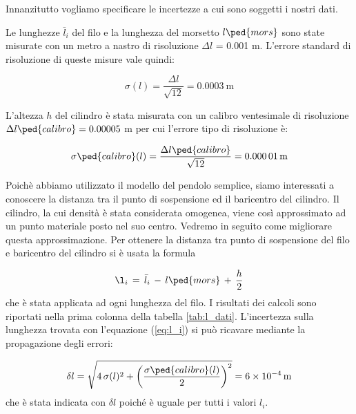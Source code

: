 \label{l_medie}

Innanzitutto vogliamo specificare le incertezze a cui sono soggetti i nostri dati.

Le lunghezze $\bar{l}_i$ del filo e la lunghezza del morsetto $l\ped{mors}$ sono state misurate con un metro a nastro di risoluzione
$\Delta l$ = 0.001 m. L'errore standard di risoluzione di queste misure vale quindi:

\begin{equation}
    \sigma(l) = \frac{\Delta l}{\sqrt{12}} = \SI{0.0003}{\metre}
\end{equation}

L'altezza $h$ del cilindro è stata misurata con un calibro ventesimale di risoluzione $\Delta l\ped{calibro} = 0.00005$ m
per cui l'errore tipo di risoluzione è:

\begin{equation}
    \sigma\ped{calibro}(l) = \frac{\Delta l\ped{calibro}}{\sqrt{12}} = \SI{0.00001}{\metre}
\end{equation}

Poichè abbiamo utilizzato il modello del pendolo semplice, siamo interessati a conoscere la distanza tra il punto
di sospensione ed il baricentro del cilindro. Il cilindro, la cui densità è stata considerata omogenea,
viene così approssimato ad un punto materiale posto nel suo centro. Vedremo in seguito come migliorare questa approssimazione.
Per ottenere la distanza tra punto di sospensione del filo e baricentro del cilindro si è usata la formula

\begin{equation}
	\l_i \,=\, \bar{l}_i \,-\, l\ped{mors} \,+\, \frac{h}{2}
    \label{eq:l_i}
\end{equation}
%
che è stata applicata ad ogni lunghezza del filo. I risultati dei calcoli sono riportati nella prima colonna
della tabella \ref{tab:l_dati}. L'incertezza sulla lunghezza trovata con l'equazione (\ref{eq:l_i}) si può ricavare mediante la propagazione
degli errori:

\begin{equation}
	\delta l = \sqrt{4\,\sigma(l)^2 + \left(\frac{\sigma\ped{calibro}(l)}{2}\right) ^2} = \SI{6e-4}{m}
\end{equation}
%
che è stata indicata con $\delta l$ poiché è uguale per tutti i valori $l_i$.

